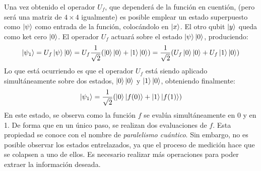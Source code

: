 Una vez obtenido el operador $U_f$, que dependerá de la función en cuentión, 
(pero será una matriz de $4 \times 4$ igualmente) es posible emplear un estado 
superpuesto como $\ket{\psi}$ como entrada de la función, colocándolo en 
$\ket{x}$. El otro qubit $\ket{y}$ queda como ket cero $\ket{0}$.
El operador $U_f$ actuará sobre el estado $\ket{\psi}\ket{0}$, produciendo:
$$ \ket{\psi_{1}} = U_f\ket{\psi}\ket{0} = U_f\frac{1}{\sqrt 2}(\ket{0}\ket{0} + 
\ket{1}\ket{0}) =
\frac{1}{\sqrt 2}(U_f\ket{0}\ket{0} + U_f\ket{1}\ket{0})$$
%
Lo que está ocurriendo es que el operador $U_f$ está siendo aplicado 
simultáneamente sobre dos estados, $\ket{0}\ket{0}$ y $\ket{1}\ket{0}$, 
obteniendo finalmente:
%
$$ \ket{\psi_{1}} = \frac{1}{\sqrt 2}(\ket{0}\ket{f(0)} + \ket{1}\ket{f(1)}) $$
%
En este estado, se observa como la función $f$ se evalúa simultáneamente en 0 y 
en 1. De forma que en un único paso, se realizan dos evaluaciones de $f$. Esta 
propiedad se conoce con el nombre de \textit{paralelismo cuántico}.
Sin embargo, no es posible observar los estados entrelazados, ya que el proceso 
de medición hace que se colapsen a uno de ellos. Es necesario realizar más 
operaciones para poder extraer la información deseada.


